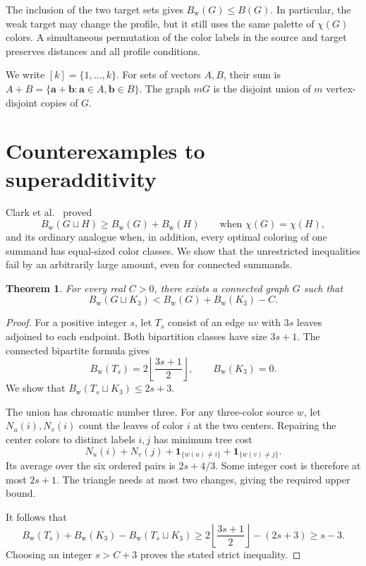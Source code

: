 \documentclass[10pt,a4paper]{amsart}
\numberwithin{equation}{section}
\newtheorem{theorem}{Theorem}[section]
\theoremstyle{definition}
\theoremstyle{remark}
\begin{document}
The inclusion
of the two target sets gives $B_{\mathrm w}(G)\le B(G)$. In particular,
the weak target may change the profile, but it still uses the same palette
of $\chi(G)$ colors. A simultaneous permutation of the color labels in
the source and target preserves distances and all profile conditions.


We write $[k]=\{1,\ldots,k\}$. For sets of vectors $A,B$, their sum is
$A+B=\{\mathbf a+\mathbf b:\mathbf a\in A,\mathbf b\in B\}$.
The graph $mG$ is the disjoint union of $m$ vertex-disjoint copies of $G$.

\section{Counterexamples to superadditivity}\label{union:section}

Clark et al.~\cite[Propositions~3.7 and~3.8]{clark2006} proved
\begin{equation}\label{union:known-weak}
 B_{\mathrm w}(G\sqcup H)\ge B_{\mathrm w}(G)+B_{\mathrm w}(H)
 \qquad\text{when }\chi(G)=\chi(H),
\end{equation}
and its ordinary analogue when, in addition, every optimal coloring
of one summand has equal-sized color classes. We show that the
unrestricted inequalities fail by an arbitrarily large amount, even
for connected summands.

\begin{theorem}\label{union:weak-counterexample}
For every real $C>0$, there exists a connected graph $G$ such that
\[
 B_{\mathrm w}(G\sqcup K_3)
 <B_{\mathrm w}(G)+B_{\mathrm w}(K_3)-C.
\]
\end{theorem}
\begin{proof}
For a positive integer $s$, let $T_s$ consist of an edge $uv$ with
$3s$ leaves adjoined to each endpoint. Both bipartition classes have
size $3s+1$. The connected bipartite formula
\cite[Proposition~3.3]{clark2006} gives
\[
 B_{\mathrm w}(T_s)=2\left\lfloor\frac{3s+1}{2}\right\rfloor,
 \qquad B_{\mathrm w}(K_3)=0.
\]
We show that $B_{\mathrm w}(T_s\sqcup K_3)\le2s+3$.

The union has chromatic number three. For any three-color source $w$,
let $N_u(i),N_v(i)$ count the leaves of color $i$ at the two centers.
Repairing the center colors to distinct labels $i,j$ has minimum tree
cost
\[
 N_u(i)+N_v(j)
 +\mathbf1_{\{w(u)\ne i\}}+\mathbf1_{\{w(v)\ne j\}}.
\]
Its average over the six ordered pairs is $2s+4/3$. Some integer cost
is therefore at most $2s+1$. The triangle needs at most two changes,
giving the required upper bound.

It follows that
\[
 B_{\mathrm w}(T_s)+B_{\mathrm w}(K_3)
 -B_{\mathrm w}(T_s\sqcup K_3)
 \ge 2\left\lfloor\frac{3s+1}{2}\right\rfloor-(2s+3)
 \ge s-3.
\]
Choosing an integer $s>C+3$ proves the stated strict inequality.
\end{proof}
\end{document}
